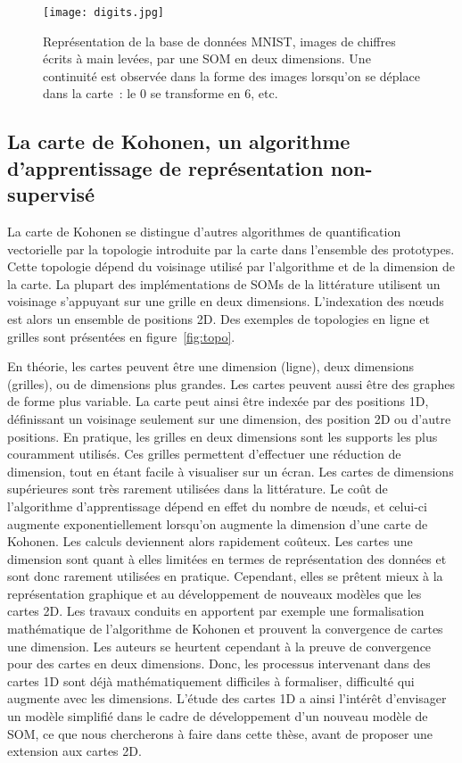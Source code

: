 \documentclass[../main]{subfiles}
\begin{document}
\begin{figure}
    \centering
    \texttt{[image: digits.jpg]}
    \caption{Représentation de la base de données MNIST, images de chiffres écrits à main levées, par une SOM en deux dimensions. Une continuité est observée dans la forme des images lorsqu'on se déplace dans la carte~: le $0$ se transforme en $6$, etc. \label{fig:digits}}
    \end{figure}
    
    
\subsection{La carte de Kohonen, un algorithme d'apprentissage de représentation non-supervisé}

La carte de Kohonen se distingue d'autres algorithmes de quantification vectorielle par la topologie introduite par la carte dans l'ensemble des prototypes. Cette topologie dépend du voisinage utilisé par l'algorithme et de la dimension de la carte.
La plupart des implémentations de SOMs de la littérature utilisent un voisinage s'appuyant sur une grille en deux dimensions. L'indexation des n\oe{}uds est alors un ensemble de positions 2D. Des exemples de topologies en ligne et grilles sont présentées en figure~\ref{fig:topo}. 

En théorie, les cartes peuvent être une dimension (ligne), deux dimensions (grilles), ou de dimensions plus grandes. Les cartes peuvent aussi être des graphes de forme plus variable. La carte peut ainsi être indexée par des positions 1D, définissant un voisinage seulement sur une dimension, des position 2D ou d'autre positions.
En pratique, les grilles en deux dimensions sont les supports les plus couramment utilisés. Ces grilles permettent d'effectuer une réduction de dimension, tout en étant facile à visualiser sur un écran. Les cartes de dimensions supérieures sont très rarement utilisées dans la littérature. Le coût de l'algorithme d'apprentissage dépend en effet du nombre de n\oe{}uds, et celui-ci augmente exponentiellement lorsqu'on augmente la dimension d'une carte de Kohonen. Les calculs deviennent alors rapidement coûteux.
Les cartes une dimension sont quant à elles limitées en termes de représentation des données et sont donc rarement utilisées en pratique. Cependant, elles se prêtent mieux à la représentation graphique et au développement de nouveaux modèles que les cartes 2D.
Les travaux conduits en \cite{cottrell_theoretical_2016,fort_soms_2006} apportent par exemple une formalisation mathématique de l'algorithme de Kohonen et prouvent la convergence de cartes une dimension. Les auteurs se heurtent cependant à la preuve de convergence pour des cartes en deux dimensions. Donc, les processus intervenant dans des cartes 1D sont déjà mathématiquement difficiles à formaliser, difficulté qui augmente avec les dimensions.
L'étude des cartes 1D a ainsi l'intérêt d'envisager un modèle simplifié dans le cadre de développement d'un nouveau modèle de SOM, ce que nous chercherons à faire dans cette thèse, avant de proposer une extension aux cartes 2D.
\end{document}
